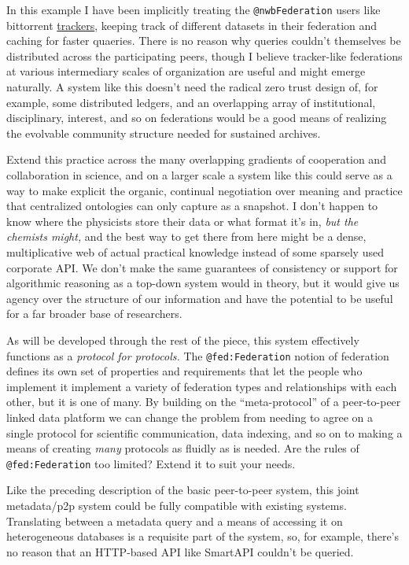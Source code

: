 \documentclass[10pt]{article}
\begin{document}
\begin{multicols}{2}
In this example I have been implicitly treating the
\texttt{@nwbFederation} users like bittorrent
\protect\hyperlink{trackers--wikis}{trackers}, keeping track of
different datasets in their federation and caching for faster quaeries.
There is no reason why queries couldn't themselves be distributed across
the participating peers, though I believe tracker-like federations at
various intermediary scales of organization are useful and might emerge
naturally. A system like this doesn't need the radical zero trust design
of, for example, some distributed ledgers, and an overlapping array of
institutional, disciplinary, interest, and so on federations would be a
good means of realizing the evolvable community structure needed for
sustained archives.

Extend this practice across the many overlapping gradients of
cooperation and collaboration in science, and on a larger scale a system
like this could serve as a way to make explicit the organic, continual
negotiation over meaning and practice that centralized ontologies can
only capture as a snapshot. I don't happen to know where the physicists
store their data or what format it's in, \emph{but the chemists might,}
and the best way to get there from here might be a dense, multiplicative
web of actual practical knowledge instead of some sparsely used
corporate API. We don't make the same guarantees of consistency or
support for algorithmic reasoning as a top-down system would in theory,
but it would give us agency over the structure of our information and
have the potential to be useful for a far broader base of researchers.

As will be developed through the rest of the piece, this system
effectively functions as a \emph{protocol for protocols.} The
\texttt{@fed:Federation} notion of federation defines its own set of
properties and requirements that let the people who implement it
implement a variety of federation types and relationships with each
other, but it is one of many. By building on the ``meta-protocol'' of a
peer-to-peer linked data platform we can change the problem from needing
to agree on a single protocol for scientific communication, data
indexing, and so on to making a means of creating \emph{many} protocols
as fluidly as is needed. Are the rules of \texttt{@fed:Federation} too
limited? Extend it to suit your needs.

Like the preceding description of the basic peer-to-peer system, this
joint metadata/p2p system could be fully compatible with existing
systems. Translating between a metadata query and a means of accessing
it on heterogeneous databases is a requisite part of the system, so, for
example, there's no reason that an HTTP-based API like SmartAPI couldn't
be queried.


\end{multicols}
\end{document}
